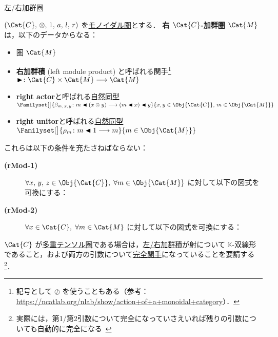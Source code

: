 \documentclass[TQFT_main]{subfiles}
\begin{document}
\begin{mydef}[label=def:modulecat,breakable]{左/右加群圏}
\begin{description}
    \end{description}

    \tcblower

    $(\Cat{C},\, \otimes,\, 1,\, a,\, l,\, r)$ を\hyperref[redef:monoidal-category]{モノイダル圏}とする．
    \textbf{右 $\Cat{C}$-加群圏} $\Cat{M}$ は，以下のデータからなる：
    \begin{itemize}
        \item 圏 $\Cat{M}$
        \item \textbf{右加群積} (left module product) と呼ばれる関手\footnote{記号として $\oslash$ を使うこともある（参考：\url{https://ncatlab.org/nlab/show/action+of+a+monoidal+category}）．} $\btr \colon \Cat{C} \times \Cat{M} \lto \Cat{M}$
        \item \textbf{right actor}と呼ばれる\hyperref[def:nat]{自然同型} $\Familyset[\big]{\beta_{m,\, x,\, y} \colon m \btl (x \otimes y) \lto (m \btl x) \btl y}{x,y \in \Obj{\Cat{C}},\, m \in \Obj{\Cat{M}}}$
        \item \textbf{right unitor}と呼ばれる\hyperref[def:nat]{自然同型} $\Familyset[\big]{\rho_{m} \colon m \btl 1 \lto m}{m \in \Obj{\Cat{M}}}$
    \end{itemize}
    これらは以下の条件を充たさねばならない：
    \begin{description}
        \item[\textbf{(rMod-1)}] $\forall x,\,y,\, z \in \Obj{\Cat{C}},\; \forall m \in \Obj{\Cat{M}}$ に対して以下の図式を可換にする：
        \item[\textbf{(rMod-2)}] $\forall x \in \Cat{C},\; \forall m \in \Cat{M}$ に対して以下の図式を可換にする：
        \begin{center}
        \end{center}
    \end{description}
    
\end{mydef}

$\Cat{C}$ が\hyperref[def:tensorfusion-cat]{多重テンソル圏}である場合は，\hyperref[def:modulecat]{左/右加群積}が射について $\mathbb{K}$-双線形であること，および両方の引数について\hyperref[def:additive-exact]{完全関手}になっていることを要請する\footnote{実際には，第1/第2引数について完全になっていさえいれば残りの引数についても自動的に完全になる~\cite[EXERCISE7.3.2, p.135]{etingof2015tensor}}．
\end{document}

